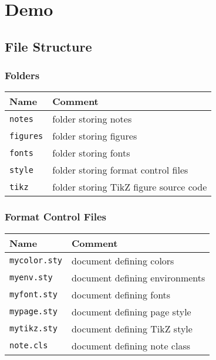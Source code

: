 \documentclass{note}
\begin{document}
\chapter{Demo}

\section{File Structure}

\subsection{Folders}
\begin{mytable}
    \begin{tabular}{ll}
        \textbf{Name} & \textbf{Comment} \\
        \hline
        \texttt{notes}   & folder storing notes \\
        \texttt{figures} & folder storing figures \\
        \texttt{fonts}   & folder storing fonts \\
        \texttt{style}   & folder storing format control files \\
        \texttt{tikz}    & folder storing TikZ figure source code
    \end{tabular}
\end{mytable}

\subsection{Format Control Files}
\begin{mytable}
    \begin{tabular}{ll}
        \textbf{Name} & \textbf{Comment} \\
        \hline
        \texttt{mycolor.sty} & document defining colors \\
        \texttt{myenv.sty}   & document defining environments \\
        \texttt{myfont.sty}  & document defining fonts \\
        \texttt{mypage.sty}  & document defining page style \\
        \texttt{mytikz.sty}  & document defining TikZ style \\
        \texttt{note.cls}    & document defining note class
    \end{tabular}
\end{mytable}
\end{document}
